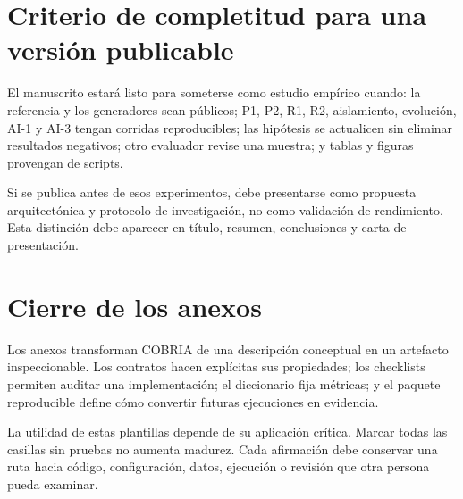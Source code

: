 \section{Criterio de completitud para una versión publicable}

El manuscrito estará listo para someterse como estudio empírico cuando: la referencia y
los generadores sean públicos; P1, P2, R1, R2, aislamiento, evolución, AI-1 y AI-3 tengan
corridas reproducibles; las hipótesis se actualicen sin eliminar resultados negativos;
otro evaluador revise una muestra; y tablas y figuras provengan de scripts.

Si se publica antes de esos experimentos, debe presentarse como propuesta arquitectónica
y protocolo de investigación, no como validación de rendimiento. Esta distinción debe
aparecer en título, resumen, conclusiones y carta de presentación.

\section{Cierre de los anexos}

Los anexos transforman COBRIA de una descripción conceptual en un artefacto inspeccionable.
Los contratos hacen explícitas sus propiedades; los checklists permiten auditar una
implementación; el diccionario fija métricas; y el paquete reproducible define cómo
convertir futuras ejecuciones en evidencia.

\enlargethispage{2\baselineskip}
La utilidad de estas plantillas depende de su aplicación crítica. Marcar todas las casillas
sin pruebas no aumenta madurez. Cada afirmación debe conservar una ruta hacia código,
configuración, datos, ejecución o revisión que otra persona pueda examinar.
